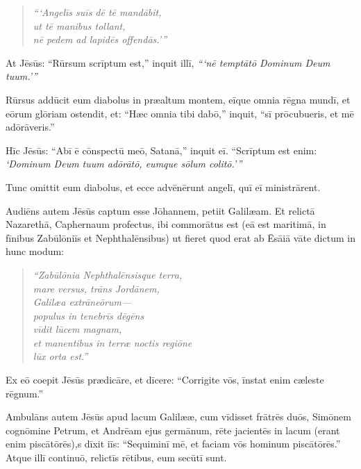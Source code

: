 \begin{verse}
\begin{patverse*}
\emph{``{}`Angelīs suīs dē tē mandābit,\\
ut tē manibus tollant,\\
nē pedem ad lapidēs offendās.'{}''}
\end{patverse*}
\end{verse}

\Versus At Jēsūs: ``Rūrsum scrīptum est,'' inquit illī, \emph{``{}`nē temptātō Dominum Deum tuum.'{}''}

\Versus Rūrsus addūcit eum diabolus in præaltum montem, eīque omnia rēgna mundī, et eōrum glōriam ostendit, 
\Versus et: ``Hæc omnia tibi dabō,'' inquit, ``sī prōcubueris, et mē adōrāveris.''

\Versus Hīc Jēsūs: ``Abī ē cōnspectū meō, Satanā,'' inquit eī. ``Scrīptum est enim: \emph{`Dominum Deum tuum adōrātō, eumque sōlum colitō.'{}''}

\Versus Tunc omittit eum diabolus, et ecce advēnērunt angelī, quī eī ministrārent.

\Versus Audiēns autem Jēsūs captum esse Jōhannem, petiit Galilæam. 
\Versus Et relictā Nazarethā, Caphernaum profectus, ibi commorātus est (eā est maritimā, in fīnibus Zabūlōniīs et Nephthalēnsibus)
\Versus ut fieret quod erat ab Ēsāiā vāte dictum in hunc modum:

\begin{verse}
\begin{patverse*}
\Versus \emph{``Zabūlōnia Nephthalēnsisque terra,\\
mare versus, trāns Jordānem,\\
Galilæa extrāneōrum—}\\
\Versus \emph{populus in tenebrīs dēgēns\\
vīdit lūcem magnam,\\
et manentibus in terræ noctis regiōne\\
lūx orta est.''}
\end{patverse*}
\end{verse}

\Versus Ex eō coepit Jēsūs prædicāre, et dīcere: ``Corrigite vōs, īnstat enim cæleste rēgnum.''

\Versus Ambulāns autem Jēsūs apud lacum Galilææ, cum vīdisset frātrēs duōs, Simōnem cognōmine Petrum, et Andrēam ejus germānum, rēte jacientēs in lacum (erant enim piscātōrēs),s 
\Versus dīxit iīs: ``Sequiminī mē, et faciam vōs hominum piscātōrēs.'' 
\Versus Atque illī continuō, relictīs rētibus, eum secūtī sunt.

